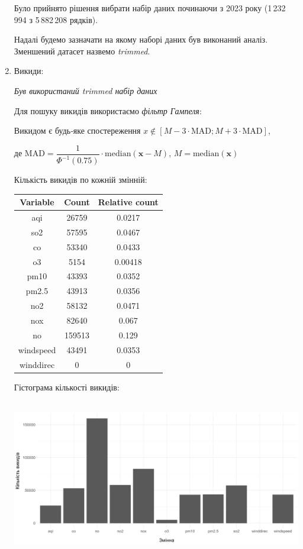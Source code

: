 \documentclass[./report.tex]{subfiles}
\begin{document}
\begin{enumerate}
    Було прийнято рішення вибрати набір даних починаючи з 2023 року
    (1\,232\,994 з 5\,882\,208 рядків).

    Надалі будемо зазначати на якому наборі даних був виконаний аналіз. Зменшений
    датасет назвемо \textit{trimmed}.

    \item Викиди:

    \quad \textit{Був використаний trimmed набір даних}

    Для пошуку викидів використаємо \textit{фільтр Гампеля}:

    \begin{displayquote}
    Викидом є будь‑яке спостереження
    $x \notin [M - 3 \cdot \text{MAD}; M + 3 \cdot \text{MAD}]$,

    де $\text{MAD} = \dfrac{1}{\Phi^{-1}(0.75)} \cdot \text{median}(\pmb{x} - M)$,
    $M = \text{median}(\pmb{x})$
    \end{displayquote}

    Кількість викидів по кожній змінній:

    \begin{tabular}{ccc}
      \hline
      \textbf{Variable} & \textbf{Count} & \textbf{Relative count} \\
      \hline
      aqi        & 26759  & 0.0217  \\
      so2        & 57595  & 0.0467  \\
      co         & 53340  & 0.0433  \\
      o3         & 5154   & 0.00418 \\
      pm10       & 43393  & 0.0352  \\
      pm2.5      & 43913  & 0.0356  \\
      no2        & 58132  & 0.0471  \\
      nox        & 82640  & 0.067   \\
      no         & 159513 & 0.129   \\
      windspeed  & 43491  & 0.0353  \\
      winddirec  & 0      & 0       \\
    \end{tabular}

   \pagebreak

    Гістограма кількості викидів:

    \includegraphics[height=2.7in]{plots/outliers/count-bar.png}


\end{enumerate}
\end{document}
